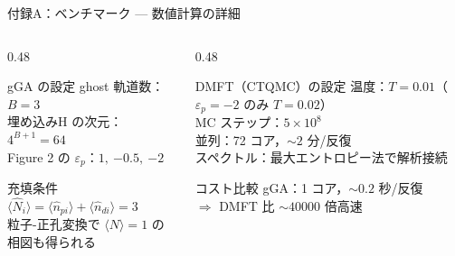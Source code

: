 \documentclass[12pt,aspectratio=169]{beamer}
\begin{document}
\begin{frame}{付録A：ベンチマーク — 数値計算の詳細}
  \begin{columns}[T]
    \begin{column}{0.48\textwidth}
      \begin{block}{gGA の設定}
        \small
        ghost 軌道数：$B=3$\\
        埋め込みH の次元：$4^{B+1}=64$\\
        Figure 2 の $\varepsilon_p$：$1,\ {-0.5},\ {-2}$
      \end{block}

      \medskip
      \begin{alertblock}{充填条件}
        \small
        $\langle\hat{N}_i\rangle = \langle\hat{n}_{pi}\rangle+\langle\hat{n}_{di}\rangle = 3$\\
        粒子-正孔変換で $\langle N\rangle=1$ の相図も得られる
      \end{alertblock}
    \end{column}

    \begin{column}{0.48\textwidth}
      \begin{block}{DMFT（CTQMC）の設定}
        \small
        温度：$T=0.01$（$\varepsilon_p=-2$ のみ $T=0.02$）\\
        MC ステップ：$5\times10^8$\\
        並列：72 コア，$\sim2$ 分/反復\\
        スペクトル：最大エントロピー法で解析接続
      \end{block}

      \medskip
      \begin{block}{コスト比較}
        \small
        gGA：1 コア，$\sim0.2$ 秒/反復\\
        $\Rightarrow$ DMFT 比 $\sim40000$ 倍高速
      \end{block}
    \end{column}
  \end{columns}
\end{frame}
\end{document}
